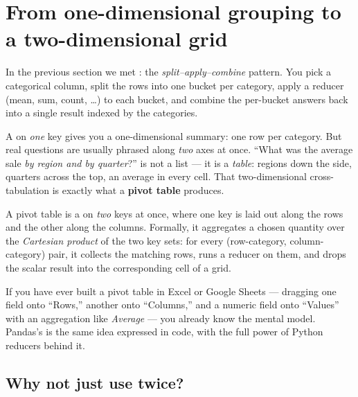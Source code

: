 \documentclass[11pt]{article}
\begin{document}

\section{From one-dimensional grouping to a two-dimensional grid}

\begin{background}
In the previous section we met : the \emph{split--apply--combine} pattern. You pick a categorical column, split the rows into one bucket per category, apply a reducer (mean, sum, count, \dots) to each bucket, and combine the per-bucket answers back into a single result indexed by the categories.

A  on \emph{one} key gives you a one-dimensional summary: one row per category. But real questions are usually phrased along \emph{two} axes at once. ``What was the average sale \emph{by region and by quarter}?'' is not a list --- it is a \emph{table}: regions down the side, quarters across the top, an average in every cell. That two-dimensional cross-tabulation is exactly what a \textbf{pivot table} produces.
\end{background}

\begin{intuition}
A pivot table is a  on \emph{two} keys at once, where one key is laid out along the rows and the other along the columns. Formally, it aggregates a chosen quantity over the \emph{Cartesian product} of the two key sets: for every (row-category, column-category) pair, it collects the matching rows, runs a reducer on them, and drops the scalar result into the corresponding cell of a grid.
\end{intuition}

If you have ever built a pivot table in Excel or Google Sheets --- dragging one field onto ``Rows,'' another onto ``Columns,'' and a numeric field onto ``Values'' with an aggregation like \emph{Average} --- you already know the mental model. Pandas's  is the same idea expressed in code, with the full power of Python reducers behind it.

\subsection{Why not just use  twice?}
\end{document}
